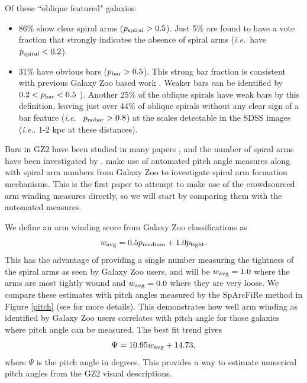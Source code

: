 \documentclass[usenatbib]{mn2e}
\newcommand{\ie}{{\it i.e.}}
\newcommand{\be}{\begin{equation}}
\newcommand{\ee}{\end{equation}}
\begin{document}
 Of these ``oblique featured" galaxies: 
\begin{itemize}
\item {86}\% show clear spiral arms ($p_{\rm spiral} > 0.5$). Just {5\%} are found to have a vote fraction that strongly indicates the absence of spiral arms (\ie ~have $p_{\rm spiral}<0.2$). 
\item {31}\% have obvious bars ($p_{\rm bar}>0.5$). This strong bar fraction is consistent with previous Galaxy Zoo based work \citep[e.g.]{Masters2011, Masters2012}. Weaker bars can be identified by $0.2<p_{\rm bar}<0.5$ \citep[e.g.]{Willett2013, Skibba2012}). Another {25}\% of the oblique spirals have weak bars by this definition, leaving just over {44\%} of oblique spirals without any clear sign of a bar feature (\ie~ $p_{\rm no bar}>0.8$) at the scales detectable in the SDSS images (\ie. 1-2 kpc at these distances). 
\end{itemize}

Bars in GZ2 have been studied in many papers \citep[e.g.][]{Masters2011, Masters2012, Skibba2012, Cheung2013, Cheung2015, Galloway2015, Kruk2017, Kruk2018}, and the number of spiral arms have been investigated by \citep{Willett2015, Hart2016, Hart2017}. \citet{Hart2017b,Hart2018} make use of automated pitch angle measures along with spiral arm numbers from Galaxy Zoo to investigate spiral arm formation mechanisms. This is the first paper to attempt to make use of the crowdsourced arm winding measures directly, so we will start by comparing them with the automated measures. 

We define an arm winding score from Galaxy Zoo classifications as
\be
\label{eqn:winding}
w_{\rm avg} =  0.5p_{\rm medium} + 1.0p_{\rm tight}.
\ee
This has the advantage of providing a single number measuring the tightness of the spiral arms as seen by Galaxy Zoo users, and will be $w_{\rm avg} = 1.0$ where the arms are most tightly wound and $w_{\rm avg} = 0.0$ where they are very loose. We compare these estimates with pitch angles measured by the SpArcFiRe method \citep{DavisHayes2014} in Figure \ref{pitch} (see \citealt{Hart2017b} for more details). This demonstrates how well arm winding as identified by Galaxy Zoo users correlates with pitch angle for those galaxies where pitch angle can be measured. The best fit trend gives 
\be
\label{eqn:pitch}
\Psi = 10.95 w_{\rm avg} + 14.73,
\ee
where $\Psi$ is the pitch angle in degrees. This provides a way to estimate numerical pitch angles from the GZ2 visual descriptions. 
\end{document}
